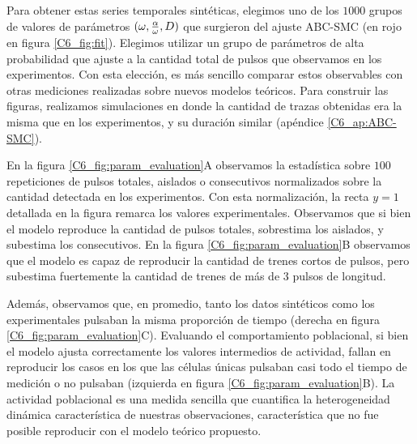 \documentclass[./main.tex]{subfiles}
\begin{document}
Para obtener estas series temporales sintéticas, elegimos uno de los $1000$ grupos de valores de parámetros $(\omega,\frac{\alpha}{\omega},D)$ que surgieron del ajuste ABC-SMC (en rojo en figura \ref{C6_fig:fit}). Elegimos utilizar un grupo de parámetros de alta probabilidad que ajuste a la cantidad total de pulsos que observamos en los experimentos. Con esta elección, es más sencillo comparar estos observables con otras mediciones realizadas sobre nuevos modelos teóricos. Para construir las figuras, realizamos simulaciones en donde la cantidad de trazas obtenidas era la misma que en los experimentos, y su duración similar (apéndice \ref{C6_ap:ABC-SMC}).


En la figura \ref{C6_fig:param_evaluation}A observamos la estadística sobre $100$ repeticiones de pulsos totales, aislados o consecutivos normalizados sobre la cantidad detectada en los experimentos. Con esta normalización, la recta $y = 1$ detallada en la figura remarca los valores experimentales. Observamos que si bien el modelo reproduce la cantidad de pulsos totales, sobrestima los aislados, y subestima los consecutivos. En la figura \ref{C6_fig:param_evaluation}B observamos que el modelo es capaz de reproducir la cantidad de trenes cortos de pulsos, pero subestima fuertemente la cantidad de trenes de más de $3$ pulsos de longitud. 


Además, observamos que, en promedio, tanto los datos sintéticos como los experimentales pulsaban la misma proporción de tiempo (derecha en figura \ref{C6_fig:param_evaluation}C). Evaluando el comportamiento poblacional, si bien el modelo ajusta correctamente los valores intermedios de actividad, fallan en reproducir los casos en los que las células únicas pulsaban casi todo el tiempo de medición o no pulsaban (izquierda en figura \ref{C6_fig:param_evaluation}B). La actividad poblacional es una medida sencilla que cuantifica la heterogeneidad dinámica característica de nuestras observaciones, característica que no fue posible reproducir con el modelo teórico propuesto.
\end{document}
